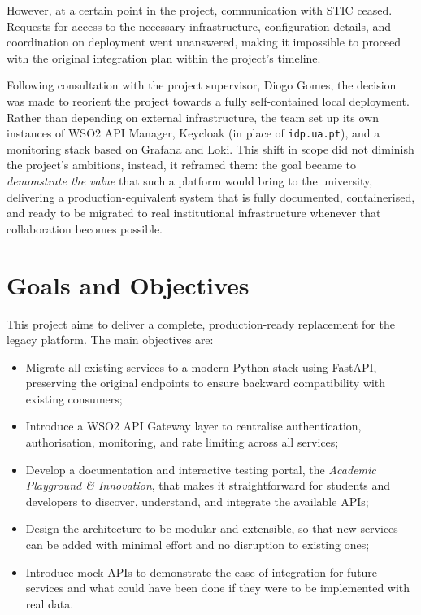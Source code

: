 \documentclass[12pt, a4paper]{report}
\begin{document}
However, at a certain point in the project, communication with STIC ceased. Requests for
access to the necessary infrastructure, configuration details, and coordination on
deployment went unanswered, making it impossible to proceed with the original integration
plan within the project's timeline.

Following consultation with the project supervisor, Diogo Gomes, the decision was made
to reorient the project towards a fully self-contained local deployment. Rather than
depending on external infrastructure, the team set up its own instances of WSO2 API
Manager, Keycloak (in place of \texttt{idp.ua.pt}), and a monitoring stack based on
Grafana and Loki. This shift in scope did not diminish the project's ambitions,
instead, it reframed them: the goal became to \textit{demonstrate the value} that such
a platform would bring to the university, delivering a production-equivalent system
that is fully documented, containerised, and ready to be migrated to real institutional
infrastructure whenever that collaboration becomes possible.

\section{Goals and Objectives}
This project aims to deliver a complete, production-ready replacement for the legacy
platform. The main objectives are:

\begin{itemize}
    \item Migrate all existing services to a modern Python stack using FastAPI, preserving
          the original endpoints to ensure backward compatibility with existing consumers;
    \item Introduce a WSO2 API Gateway layer to centralise authentication, authorisation,
          monitoring, and rate limiting across all services;
    \item Develop a documentation and interactive testing portal, the
          	\textit{Academic Playground \& Innovation}, that makes it straightforward
          for students and developers to discover, understand, and integrate the available APIs;
    \item Design the architecture to be modular and extensible, so that new services can
          be added with minimal effort and no disruption to existing ones;
    \item Introduce mock APIs to demonstrate the ease of integration for future services
          and what could have been done if they were to be implemented with real data.
\end{itemize}
\end{document}
